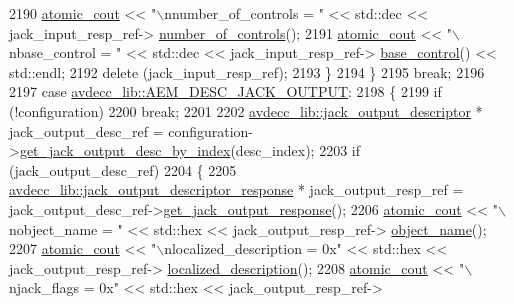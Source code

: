 \begin{DoxyCode}
2190             \hyperlink{cmd__line_8h_a0bc38ccc65c79ba06c6fcd7b4bf554c3}{atomic\_cout} << \textcolor{stringliteral}{"\(\backslash\)nnumber\_of\_controls = "} << std::dec << jack\_input\_resp\_ref->
      \hyperlink{classavdecc__lib_1_1jack__input__descriptor__response_a5accf7abc7d231a0767ad5cac68b8b39}{number\_of\_controls}();
2191             \hyperlink{cmd__line_8h_a0bc38ccc65c79ba06c6fcd7b4bf554c3}{atomic\_cout} << \textcolor{stringliteral}{"\(\backslash\)nbase\_control = "} << std::dec << jack\_input\_resp\_ref->
      \hyperlink{classavdecc__lib_1_1jack__input__descriptor__response_ac1f5297533142234c764e84c01ce5a16}{base\_control}() << std::endl;
2192             \textcolor{keyword}{delete} (jack\_input\_resp\_ref);
2193         \}
2194     \}
2195     \textcolor{keywordflow}{break};
2196 
2197     \textcolor{keywordflow}{case} \hyperlink{namespaceavdecc__lib_ac7b7d227e46bc72b63ee9e9aae15902fab14c53680e2a06bc1fdd35ae57e30de9}{avdecc\_lib::AEM\_DESC\_JACK\_OUTPUT}:
2198     \{
2199         \textcolor{keywordflow}{if} (!configuration)
2200             \textcolor{keywordflow}{break};
2201 
2202         \hyperlink{classavdecc__lib_1_1jack__output__descriptor}{avdecc\_lib::jack\_output\_descriptor} * jack\_output\_desc\_ref = 
      configuration->\hyperlink{classavdecc__lib_1_1configuration__descriptor_ae6a68f83733b54540614b729548a180b}{get\_jack\_output\_desc\_by\_index}(desc\_index);
2203         \textcolor{keywordflow}{if} (jack\_output\_desc\_ref)
2204         \{
2205             \hyperlink{classavdecc__lib_1_1jack__output__descriptor__response}{avdecc\_lib::jack\_output\_descriptor\_response} * 
      jack\_output\_resp\_ref = jack\_output\_desc\_ref->\hyperlink{classavdecc__lib_1_1jack__output__descriptor_a326e14cfb01567fe3535428ad3b27f93}{get\_jack\_output\_response}();
2206             \hyperlink{cmd__line_8h_a0bc38ccc65c79ba06c6fcd7b4bf554c3}{atomic\_cout} << \textcolor{stringliteral}{"\(\backslash\)nobject\_name = "} << std::hex << jack\_output\_resp\_ref->
      \hyperlink{classavdecc__lib_1_1descriptor__response__base_a133f7774946d80f82b8aaaa4cfbb7361}{object\_name}();
2207             \hyperlink{cmd__line_8h_a0bc38ccc65c79ba06c6fcd7b4bf554c3}{atomic\_cout} << \textcolor{stringliteral}{"\(\backslash\)nlocalized\_description = 0x"} << std::hex << jack\_output\_resp\_ref->
      \hyperlink{classavdecc__lib_1_1jack__output__descriptor__response_a1fb9de45567df344090a1407aa6b775f}{localized\_description}();
2208             \hyperlink{cmd__line_8h_a0bc38ccc65c79ba06c6fcd7b4bf554c3}{atomic\_cout} << \textcolor{stringliteral}{"\(\backslash\)njack\_flags = 0x"} << std::hex << jack\_output\_resp\_ref->

\end{DoxyCode}
